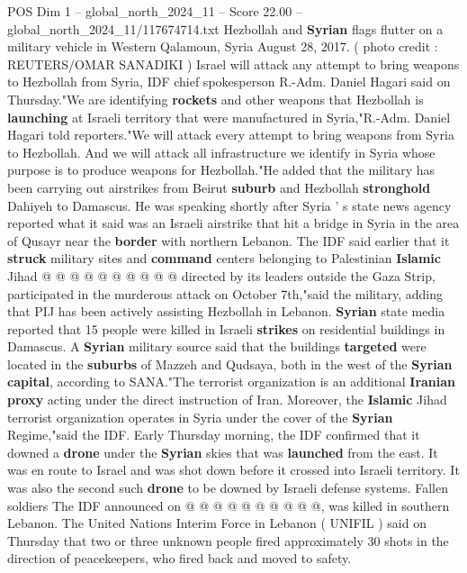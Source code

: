 \begin{textsample}{POS Dim 1 – global\_north\_2024\_11 – Score 22.00 – global\_north\_2024\_11/117674714.txt}  \label{ex:f1_pos_233}
Hezbollah and \textbf{Syrian} flags flutter on a military vehicle in Western Qalamoun, Syria August 28, 2017. ( photo credit : REUTERS/OMAR SANADIKI ) Israel will attack any attempt to bring weapons to Hezbollah from Syria, IDF chief spokesperson R.-Adm.
Daniel Hagari said on Thursday."We are identifying \textbf{rockets} and other weapons that Hezbollah is \textbf{launching} at Israeli territory that were manufactured in Syria,"R.-Adm.
Daniel Hagari told reporters."We will attack every attempt to bring weapons from Syria to Hezbollah.
And we will attack all infrastructure we identify in Syria whose purpose is to produce weapons for Hezbollah."He added that the military has been carrying out airstrikes from Beirut \textbf{suburb} and Hezbollah \textbf{stronghold} Dahiyeh to Damascus.
He was speaking shortly after Syria ' s state news agency reported what it said was an Israeli airstrike that hit a bridge in Syria in the area of Qusayr near the \textbf{border} with northern Lebanon.
The IDF said earlier that it \textbf{struck} military sites and \textbf{command} centers belonging to Palestinian \textbf{Islamic} Jihad @ @ @ @ @ @ @ @ @ @ directed by its leaders outside the Gaza Strip, participated in the murderous attack on October 7th,"said the military, adding that PIJ has been actively assisting Hezbollah in Lebanon. \textbf{Syrian} state media reported that 15 people were killed in Israeli \textbf{strikes} on residential buildings in Damascus.
A \textbf{Syrian} military source said that the buildings \textbf{targeted} were located in the \textbf{suburbs} of Mazzeh and Qudsaya, both in the west of the \textbf{Syrian} \textbf{capital}, according to SANA."The terrorist organization is an additional \textbf{Iranian} \textbf{proxy} acting under the direct instruction of Iran.
Moreover, the \textbf{Islamic} Jihad terrorist organization operates in Syria under the cover of the \textbf{Syrian} Regime,"said the IDF.
Early Thursday morning, the IDF confirmed that it downed a \textbf{drone} under the \textbf{Syrian} skies that was \textbf{launched} from the east.
It was en route to Israel and was shot down before it crossed into Israeli territory.
It was also the second such \textbf{drone} to be downed by Israeli defense systems.
Fallen soldiers The IDF announced on @ @ @ @ @ @ @ @ @ @, was killed in southern Lebanon.
The United Nations Interim Force in Lebanon ( UNIFIL ) said on Thursday that two or three unknown people fired approximately 30 shots in the direction of peacekeepers, who fired back and moved to safety.

\end{textsample}
